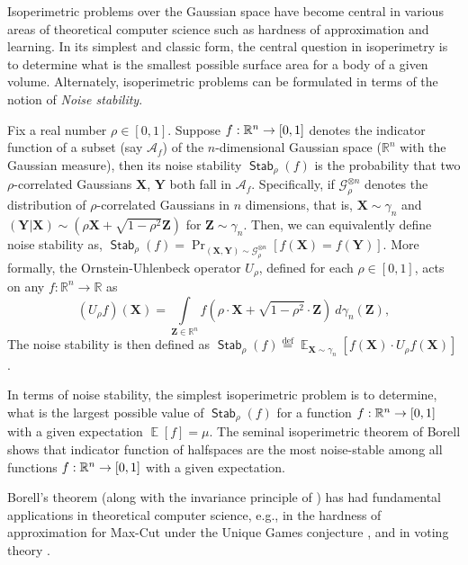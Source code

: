 \documentclass[11pt]{article}
\newcommand{\inparen}[1]{\left ( #1 \right )}
\newcommand{\defeq}{\stackrel{\mathrm{def}}{=}}
\DeclareMathOperator*{\Ex}{\mathbb{E}}
\DeclareMathOperator*{\Stab}{\mathsf{Stab}}
\newcommand{\bbR}{{\mathbb R}}
\newcommand{\bX}{\mathbf{X}}
\newcommand{\bY}{\mathbf{Y}}
\newcommand{\bZ}{\mathbf{Z}}
\newcommand{\calA}{\mathcal{A}}
\newcommand{\calG}{\mathcal{G}}
\begin{document}
Isoperimetric problems over the Gaussian space have become central in various areas of theoretical computer science such as hardness of approximation and learning. 
%
In its simplest and classic form, the central question in isoperimetry is to determine what is the smallest possible surface area for a body of a given volume.
%
Alternately, isoperimetric problems can be formulated in terms of the notion of {\em Noise stability}.

Fix a real number $\rho \in [0,1]$.
%
Suppose $f : \mathbb{R}^n \to [0,1]$ denotes the indicator function of a subset (say $\calA_f$) of the $n$-dimensional Gaussian space ($\mathbb{R}^n$ with the Gaussian measure), then its noise stability $\Stab_\rho(f)$ is the probability that two $\rho$-correlated Gaussians $\bX$, $\bY$ both fall in $\calA_f$.
%
Specifically, if $\calG_\rho^{\otimes n}$ denotes the distribution of $\rho$-correlated Gaussians in $n$ dimensions, that is, $\bX \sim \gamma_n$ and $(\bY | \bX) \sim (\rho \bX + \sqrt{1-\rho^2} \bZ)$ for $\bZ \sim \gamma_n$.
Then, we can equivalently define noise stability as, $\Stab_\rho(f) = \Pr_{(\bX, \bY) \sim \calG_\rho^{\otimes n}} [f(\bX) = f(\bY)]$.  
%
More formally, the Ornstein-Uhlenbeck operator $U_\rho$, defined for each $\rho \in [0,1]$, acts on any $f : \bbR^n \to \bbR$ as
\begin{equation*}
(U_\rho f)(\bX) = \int\limits_{\bZ \in \mathbb{R}^n} f\inparen{\rho \cdot \bX + \sqrt{1-\rho^2} \cdot \bZ} \ d\gamma_n(\bZ),
\end{equation*}
The noise stability is then defined as $\Stab_\rho(f) \defeq \Ex_{\bX \sim \gamma_n} [f(\bX) \cdot U_\rho f (\bX)]$.  



In terms of noise stability, the simplest isoperimetric problem is to determine, what is the largest possible value of $\Stab_\rho(f)$ for a function $f: \mathbb{R}^n \to [0,1]$ with a given expectation $\Ex[f] = \mu$.
%
The seminal isoperimetric theorem of Borell \cite{borell1985geometric} shows that indicator function of halfspaces are the most noise-stable among all functions $f: \mathbb{R}^n \to [0,1]$ with a given expectation.

Borell's theorem (along with the invariance principle of \cite{mossel2005noise, mossel2010gaussianbounds}) has had fundamental applications in theoretical computer science, e.g., in the hardness of approximation for Max-Cut under the Unique Games conjecture \cite{khot2007optimal}, and in voting theory \cite{mossel2010gaussianbounds}.
\end{document}
